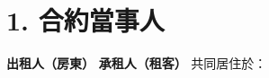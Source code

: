\section*{1. 合約當事人}
\textbf{出租人（房東）}
\ContractLandlordsZHTW
\vspace{0.5cm}
\textbf{承租人（租客）}
\ContractTenantsZHTW
共同居住於：\Propaddress
